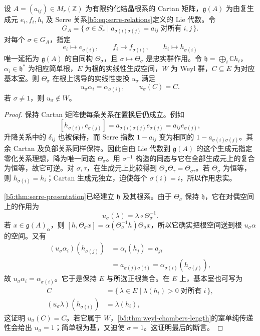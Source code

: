 \begin{proposition}\label{b5:prop:serre-diagram-automorphism}
	设 \(A=(a_{ij})\in M_r(\mathbb Z)\) 为有限约化结晶根系的 Cartan 矩阵，\(\mathfrak g(A)\) 为由复生成元 \(e_i,f_i,h_i\) 及 Serre 关系\eqref{b5:eq:serre-relations}定义的 Lie 代数。令
	\[
		G_A=\{\,\sigma\in S_r\mid a_{\sigma(i)\sigma(j)}=a_{ij}\;\text{对所有}\;i,j\,\}.
	\]
	对每个 \(\sigma\in G_A\)，指定
	\[
		e_i\longmapsto e_{\sigma(i)},\qquad f_i\longmapsto f_{\sigma(i)},\qquad h_i\longmapsto h_{\sigma(i)}
	\]
	唯一延拓为 \(\mathfrak g(A)\) 的自同构 \(\Theta_\sigma\)，且 \(\sigma\mapsto\Theta_\sigma\) 是忠实群作用。令 \(\mathfrak h=\bigoplus_i\mathbb Ch_i\)，\(\alpha_i\in\mathfrak h^*\) 为相应简单根，\(E\) 为根的实线性生成空间，\(W\) 为 Weyl 群，\(C\subseteq E\) 为对应基本室。则 \(\Theta_\sigma\) 在根上诱导的实线性变换 \(u_\sigma\) 满足
	\[
		u_\sigma\alpha_i=\alpha_{\sigma(i)},\qquad u_\sigma(C)=C.
	\]
	若 \(\sigma\ne1\)，则 \(u_\sigma\notin W\)。
\end{proposition}
\begin{proof}
	保持 Cartan 矩阵使每条关系在置换后仍成立。例如
	\[
		[h_{\sigma(i)},e_{\sigma(j)}] =a_{\sigma(i)\sigma(j)}e_{\sigma(j)} =a_{ij}e_{\sigma(j)},
	\]
	升降关系中的 \(\delta_{ij}\) 也被保持，而 Serre 指数 \(1-a_{ij}\) 变为相同的 \(1-a_{\sigma(i)\sigma(j)}\)。其余 Cartan 及负部关系同样保持。因此自由 Lie 代数到 \(\mathfrak g(A)\) 的这个生成元指定零化关系理想，降为唯一同态 \(\Theta_\sigma\)。用 \(\sigma^{-1}\) 构造的同态与它在全部生成元上的复合为恒等，故它可逆。对 \(\sigma,\tau\)，在生成元上比较得到 \(\Theta_\sigma\Theta_\tau=\Theta_{\sigma\tau}\)。若 \(\Theta_\sigma\) 为恒等，则 \(h_{\sigma(i)}=h_i\)；Cartan 生成元独立，迫使每个 \(\sigma(i)=i\)，所以作用忠实。

	\cref{b5:thm:serre-presentation}已经建立 \(\mathfrak h\) 及其根系。由于 \(\Theta_\sigma\) 保持 \(\mathfrak h\)，它在对偶空间上的作用为
	\[
		u_\sigma(\lambda)=\lambda\circ\Theta_\sigma^{-1}.
	\]
	若 \(x\in\mathfrak g(A)_\alpha\)，则 \([h,\Theta_\sigma x]=\alpha(\Theta_\sigma^{-1}h)\Theta_\sigma x\)，所以它确实把根空间送到根 \(u_\sigma\alpha\) 的空间。又有
	\[
		\begin{aligned}
			(u_\sigma\alpha_i)(h_{\sigma(j)}) &=\alpha_i(h_j)=a_{ji}\\
			&=a_{\sigma(j)\sigma(i)} =\alpha_{\sigma(i)}(h_{\sigma(j)}),
		\end{aligned}
	\]
	故 \(u_\sigma\alpha_i=\alpha_{\sigma(i)}\)。它于是保持 \(E\) 与所选正根集合。在 \(E\) 上，基本室也可写为
	\[
		\begin{aligned}
			C&=\{\,\lambda\in E\mid\lambda(h_i)>0\;\text{对所有}\;i\,\},\\
			(u_\sigma\lambda)(h_{\sigma(i)})&=\lambda(h_i),
		\end{aligned}
	\]
	这证明 \(u_\sigma(C)=C\)。若它属于 \(W\)，\cref{b5:thm:weyl-chambers-length}的室单纯传递性会给出 \(u_\sigma=1\)；简单根为基，又迫使 \(\sigma=1\)。这证明最后的断言。
\end{proof}

